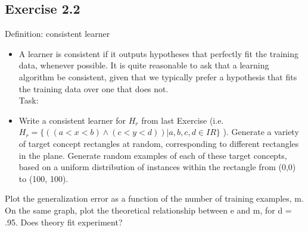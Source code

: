 \documentclass[a4paper, 12pt]{article}
\begin{document}
\subsection*{Exercise 2.2}

Definition: consistent learner

\begin{itemize}
\item A learner is consistent if it outputs hypotheses that perfectly fit the training data, whenever possible. It is quite reasonable to ask that a learning algorithm be consistent, given that we typically prefer a hypothesis that fits the training data over one that does not. \\

Task:
\item Write a consistent learner for $H_r$ from last Exercise (i.e. $H_r = \{((a < x < b) \wedge (c < y < d)) | a, b, c, d \in IR\}$ ). Generate a variety of target concept rectangles at random, corresponding to different rectangles in the plane. Generate random examples of each of these target concepts, based on a uniform distribution of instances within the rectangle from (0,0) to (100, 100).

\end{itemize}

Plot the generalization error as a function of the number of training examples, m. On the same graph, plot the theoretical relationship between e and m, for d = .95. Does theory fit experiment?
\end{document}
